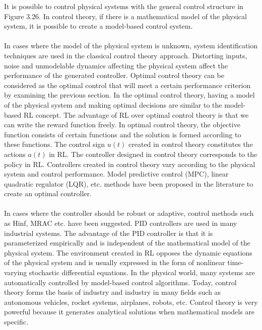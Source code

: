 \documentclass[12pt,twoside,a4]{mwbk}
\begin{document}
\noindent It is possible to control physical systems with the general control structure in Figure 3.26. In control theory, if there is a mathematical model of the physical system, it is possible to create a model-based control system.
\\ \\
In cases where the model of the physical system is unknown, system identification techniques are used in the classical control theory approach. Distorting inputs, noise and unmodelable dynamics affecting the physical system affect the performance of the generated controller. Optimal control theory can be considered as the optimal control that will meet a certain performance criterion by examining the previous section. In the optimal control theory, having a model of the physical system and making optimal decisions are similar to the model-based RL concept. The advantage of RL over optimal control theory is that we can write the reward function freely. In optimal control theory, the objective function consists of certain functions and the solution is formed according to these functions. The control sign $u(t)$ created in control theory constitutes the actions $a(t)$ in RL. The controller designed in control theory corresponds to the policy in RL. Controllers created in control theory vary according to the physical system and control performance. Model predictive control (MPC), linear quadratic regulator (LQR), etc. methods have been proposed in the literature to create an optimal controller. 
\\ \\
In cases where the controller should be robust or adaptive, control methods such as Hinf, MRAC etc. have been suggested. PID controllers are used in many industrial systems. The advantage of the PID controller is that it is parameterized empirically and is independent of the mathematical model of the physical system. The environment created in RL opposes the dynamic equations of the physical system and is usually expressed in the form of nonlinear time-varying stochastic differential equations. In the physical world, many systems are automatically controlled by model-based control algorithms. Today, control theory forms the basis of industry and industry in many fields such as autonomous vehicles, rocket systems, airplanes, robots, etc. Control theory is very powerful because it generates analytical solutions when mathematical models are specific. 
\\ \\
\end{document}
